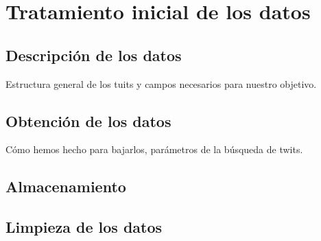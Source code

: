 \chapter{Tratamiento inicial de los datos}
\section{Descripci\'on de los datos}
Estructura general de los tuits y campos necesarios para nuestro objetivo. 
\section{Obtenci\'on de los datos}
C\'omo hemos hecho para bajarlos, par\'ametros de la b\'usqueda de twits.
\section{Almacenamiento}
\section{Limpieza de los datos}
